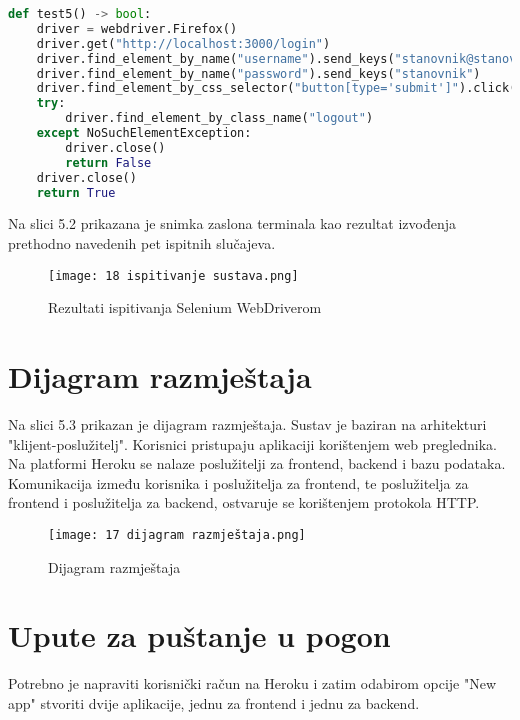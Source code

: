 			\begin{lstlisting}[language=Python, breaklines=true]
def test5() -> bool:
    driver = webdriver.Firefox()
    driver.get("http://localhost:3000/login")
    driver.find_element_by_name("username").send_keys("stanovnik@stanovnik.com")
    driver.find_element_by_name("password").send_keys("stanovnik")
    driver.find_element_by_css_selector("button[type='submit']").click()
    try:
        driver.find_element_by_class_name("logout")
    except NoSuchElementException:
        driver.close()
        return False
    driver.close()
    return True
			\end{lstlisting}

			Na slici 5.2 prikazana je snimka zaslona terminala kao rezultat izvođenja prethodno navedenih pet ispitnih slučajeva.

			\begin{figure}[H]
					\centering
					\texttt{[image: 18 ispitivanje sustava.png]}
					\caption{Rezultati ispitivanja Selenium WebDriverom}
				\end{figure}
			\eject


		\section{Dijagram razmještaja}

		Na slici 5.3 prikazan je dijagram razmještaja. Sustav je baziran na arhitekturi "klijent-poslužitelj". Korisnici pristupaju aplikaciji korištenjem web preglednika. Na platformi Heroku se nalaze poslužitelji za frontend, backend i bazu podataka. Komunikacija između korisnika i poslužitelja za frontend, te poslužitelja za frontend i poslužitelja za backend, ostvaruje se korištenjem protokola HTTP.

			\begin{figure}[H]
					\centering
					\texttt{[image: 17 dijagram razmještaja.png]}
					\caption{Dijagram razmještaja}
				\end{figure}

			\eject

		\section{Upute za puštanje u pogon}
		
		
		Potrebno je napraviti korisnički račun na Heroku i zatim odabirom opcije "New app" stvoriti dvije aplikacije, jednu za frontend i jednu za backend.
		
